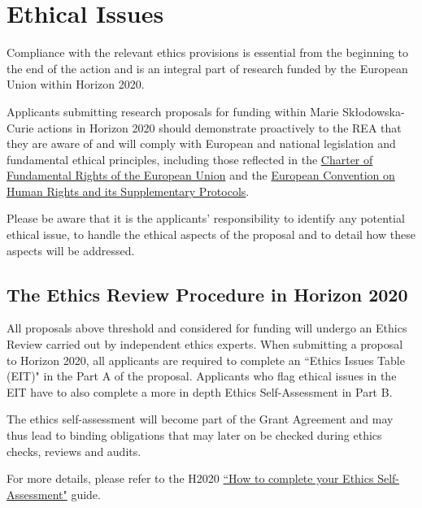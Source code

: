 \documentclass[a4paper,11pt]{article}
\begin{document}
\newpage

\section{Ethical Issues}

Compliance with the relevant ethics provisions is essential from the beginning to
the end of the action and is an integral part of research funded by the European
Union within Horizon 2020.

Applicants submitting research proposals for funding within Marie Sk\l{}odowska-Curie actions in Horizon 2020 should demonstrate proactively to the REA that they are aware of and will comply with European and national legislation and fundamental ethical principles, including those reflected in the \href{http://www.europarl.europa.eu/charter/pdf/text_en.pdf}{Charter of Fundamental Rights of the European Union} and the \href{http://www.echr.coe.int/Documents/Convention_ENG.pdf}{European Convention on Human Rights and its Supplementary Protocols}.

Please be aware that it is the applicants' responsibility to identify any potential ethical issue, to handle the ethical aspects of the proposal and to detail how these aspects will be addressed.

\subsection*{The Ethics Review Procedure in Horizon 2020}
All proposals above threshold and considered for funding will undergo an Ethics Review carried out by independent ethics experts. When submitting a proposal to Horizon 2020, all applicants are required to complete an ``Ethics Issues Table (EIT)" in the Part A of the proposal. Applicants who flag ethical issues in the EIT
have to also complete a more in depth Ethics Self-Assessment in Part B.

The ethics self-assessment will become part of the Grant Agreement and may
thus lead to binding obligations that may later on be checked during ethics
checks, reviews and audits.

For more details, please refer to the H2020 \href{http://ec.europa.eu/research/participants/data/ref/h2020/grants_manual/hi/ethics/h2020_hi_ethics-self-assess_en.pdf}{``How to complete your Ethics
Self- Assessment"} guide.

\end{document}
